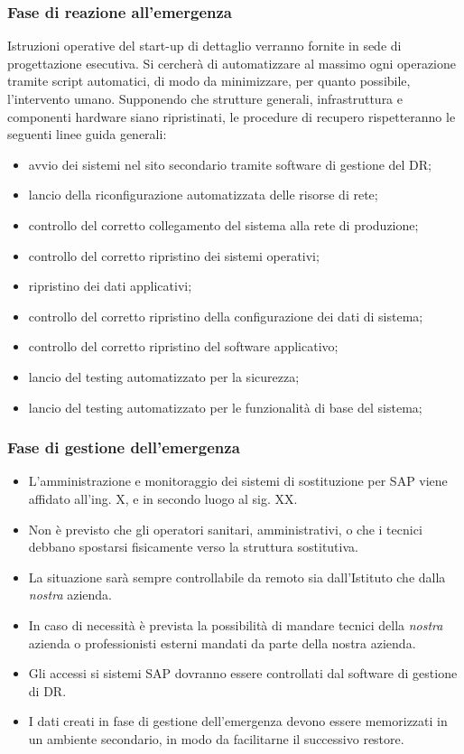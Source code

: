 \subsubsection{Fase di reazione all’emergenza}
Istruzioni operative del start-up di dettaglio verranno fornite in sede di progettazione esecutiva. Si cercherà di automatizzare al massimo ogni operazione tramite script automatici, di modo da minimizzare, per quanto possibile, l'intervento umano. 
Supponendo che strutture generali, infrastruttura e componenti hardware siano ripristinati, le procedure di recupero rispetteranno le seguenti linee guida generali:
\begin{itemize}
\item avvio dei sistemi nel sito secondario tramite software di gestione del DR;
\item lancio della riconfigurazione automatizzata delle risorse di rete;
\item controllo del corretto collegamento del sistema alla rete di produzione;
\item controllo del corretto ripristino dei sistemi operativi;
\item ripristino dei dati applicativi;
\item controllo del corretto ripristino della configurazione dei dati di sistema;
\item controllo del corretto ripristino del software applicativo;
\item lancio del testing automatizzato per la sicurezza;
\item lancio del testing automatizzato per le funzionalità di base del sistema;
\end{itemize}

\subsubsection{Fase di gestione dell’emergenza}
\begin{itemize}
\item L'amministrazione e monitoraggio dei sistemi di sostituzione per SAP viene affidato all'ing. X, e in secondo luogo al sig. XX.
\item Non è previsto che gli operatori sanitari, amministrativi, o che i tecnici debbano spostarsi fisicamente verso la struttura sostitutiva.
\item La situazione sarà sempre controllabile da remoto sia dall'Istituto che dalla \textit{nostra} azienda.
\item In caso di necessità è prevista la possibilità di mandare tecnici della \textit{nostra} azienda o professionisti esterni mandati da parte della nostra azienda.
\item Gli accessi si sistemi SAP dovranno essere controllati dal software di gestione di DR.
\item I dati creati in fase di gestione dell'emergenza devono essere memorizzati in un ambiente secondario, in modo da facilitarne il successivo restore.
\end{itemize}



